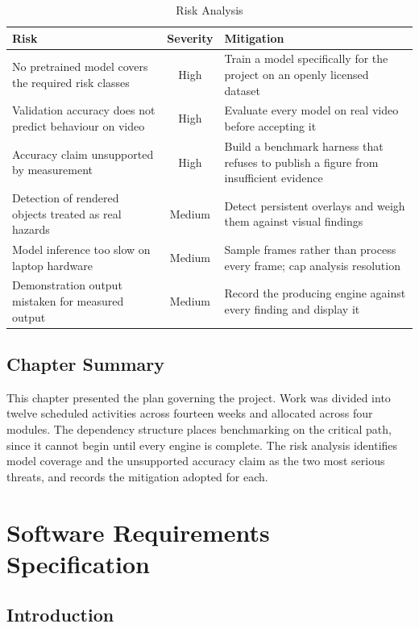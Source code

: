 \documentclass[12pt,a4paper,twoside]{report}
\begin{document}
\begin{table}[h]
\centering
\begin{tabular}{|p{5cm}|c|p{5cm}|}
\hline
\textbf{Risk} & \textbf{Severity} & \textbf{Mitigation} \\
\hline
No pretrained model covers the required risk classes & High & Train a model specifically for the project on an openly licensed dataset \\
\hline
Validation accuracy does not predict behaviour on video & High & Evaluate every model on real video before accepting it \\
\hline
Accuracy claim unsupported by measurement & High & Build a benchmark harness that refuses to publish a figure from insufficient evidence \\
\hline
Detection of rendered objects treated as real hazards & Medium & Detect persistent overlays and weigh them against visual findings \\
\hline
Model inference too slow on laptop hardware & Medium & Sample frames rather than process every frame; cap analysis resolution \\
\hline
Demonstration output mistaken for measured output & Medium & Record the producing engine against every finding and display it \\
\hline
\end{tabular}
\caption{Risk Analysis}
\end{table}

\section{Chapter Summary}

This chapter presented the plan governing the project. Work was divided into twelve scheduled activities across fourteen weeks and allocated across four modules. The dependency structure places benchmarking on the critical path, since it cannot begin until every engine is complete. The risk analysis identifies model coverage and the unsupported accuracy claim as the two most serious threats, and records the mitigation adopted for each.

\chapter{Software Requirements Specification}

\section{Introduction}
\end{document}
